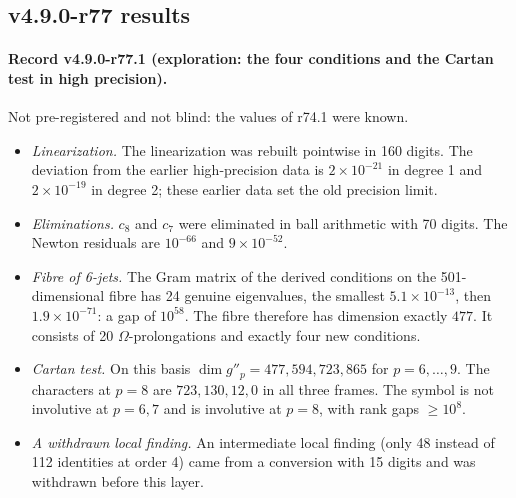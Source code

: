 \subsection*{v4.9.0-r77 results}
\label{subsec:v490-r77-results}

\paragraph{Record v4.9.0-r77.1 (exploration: the four conditions and the Cartan test in high precision).}
Not pre-registered and not blind: the values of r74.1 were known.
\begin{itemize}[leftmargin=2em]
\item \emph{Linearization.}  The linearization was rebuilt pointwise in 160 digits.  The deviation from the earlier
high-precision data is \(2\times10^{-21}\) in degree 1 and \(2\times10^{-19}\) in degree 2; these earlier data set the old
precision limit.
\item \emph{Eliminations.}  \(c_8\) and \(c_7\) were eliminated in ball arithmetic with 70 digits.  The Newton residuals are
\(10^{-66}\) and \(9\times10^{-52}\).
\item \emph{Fibre of 6-jets.}  The Gram matrix of the derived conditions on the 501-dimensional fibre has 24 genuine
eigenvalues, the smallest \(5.1\times10^{-13}\), then \(1.9\times10^{-71}\): a gap of \(10^{58}\).  The fibre therefore has
dimension exactly \(477\).  It consists of 20 \(\Omega\)-prolongations and exactly four new conditions.
\item \emph{Cartan test.}  On this basis \(\dim g''_p=477,594,723,865\) for \(p=6,\dots,9\).  The characters at \(p=8\) are
\(723,130,12,0\) in all three frames.  The symbol is not involutive at \(p=6,7\) and is involutive at \(p=8\), with rank
gaps \(\ge10^{8}\).
\item \emph{A withdrawn local finding.}  An intermediate local finding (only 48 instead of 112 identities at order 4) came
from a conversion with 15 digits and was withdrawn before this layer.
\end{itemize}

